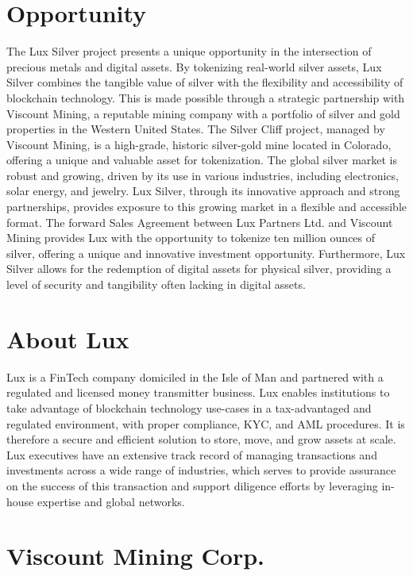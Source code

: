 \documentclass[11pt]{article}
\begin{document}
\section{Opportunity}

The Lux Silver project presents a unique opportunity in the intersection of precious metals and digital assets. By tokenizing real-world silver assets, Lux Silver combines the tangible value of silver with the flexibility and accessibility of blockchain technology. This is made possible through a strategic partnership with Viscount Mining, a reputable mining company with a portfolio of silver and gold properties in the Western United States. The Silver Cliff project, managed by Viscount Mining, is a high-grade, historic silver-gold mine located in Colorado, offering a unique and valuable asset for tokenization. The global silver market is robust and growing, driven by its use in various industries, including electronics, solar energy, and jewelry. Lux Silver, through its innovative approach and strong partnerships, provides exposure to this growing market in a flexible and accessible format. The forward Sales Agreement between Lux Partners Ltd. and Viscount Mining provides Lux with the opportunity to tokenize ten million ounces of silver, offering a unique and innovative investment opportunity. Furthermore, Lux Silver allows for the redemption of digital assets for physical silver, providing a level of security and tangibility often lacking in digital assets.


\section{About Lux}

Lux is a FinTech company domiciled in the Isle of Man and partnered with a regulated and licensed money transmitter business. Lux enables institutions to take advantage of blockchain technology use-cases in a tax-advantaged and regulated environment, with proper compliance, KYC, and AML procedures. It is therefore a secure and efficient solution to store, move, and grow assets at scale. Lux executives have an extensive track record of managing transactions and investments across a wide range of industries, which serves to provide assurance on the success of this transaction and support diligence efforts by leveraging in-house expertise and global networks.


\section{Viscount Mining Corp.}
\end{document}
